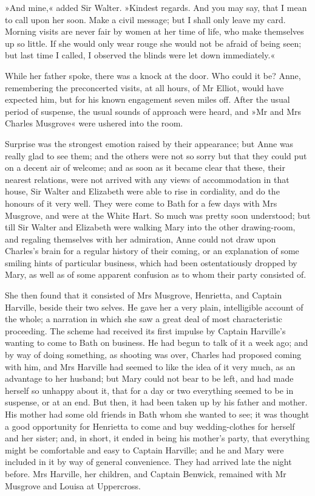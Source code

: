 »And mine,« added Sir Walter. »Kindest regards. And you may say, that I mean to call upon her soon. Make a civil message; but I shall only leave my card. Morning visits are never fair by women at her time of life, who make themselves up so little. If she would only wear rouge she would not be afraid of being seen; but last time I called, I observed the blinds were let down immediately.«

While her father spoke, there was a knock at the door. Who could it be? Anne, remembering the preconcerted visits, at all hours, of Mr Elliot, would have expected him, but for his known engagement seven miles off. After the usual period of suspense, the usual sounds of approach were heard, and »Mr and Mrs Charles Musgrove« were ushered into the room.

Surprise was the strongest emotion raised by their appearance; but Anne was really glad to see them; and the others were not so sorry but that they could put on a decent air of welcome; and as soon as it became clear that these, their nearest relations, were not arrived with any views of accommodation in that house, Sir Walter and Elizabeth were able to rise in cordiality, and do the honours of it very well. They were come to Bath for a few days with Mrs Musgrove, and were at the White Hart. So much was pretty soon understood; but till Sir Walter and Elizabeth were walking Mary into the other drawing-room, and regaling themselves with her admiration, Anne could not draw upon Charles's brain for a regular history of their coming, or an explanation of some smiling hints of particular business, which had been ostentatiously dropped by Mary, as well as of some apparent confusion as to whom their party consisted of.

She then found that it consisted of Mrs Musgrove, Henrietta, and Captain Harville, beside their two selves. He gave her a very plain, intelligible account of the whole; a narration in which she saw a great deal of most characteristic proceeding. The scheme had received its first impulse by Captain Harville's wanting to come to Bath on business. He had begun to talk of it a week ago; and by way of doing something, as shooting was over, Charles had proposed coming with him, and Mrs Harville had seemed to like the idea of it very much, as an advantage to her husband; but Mary could not bear to be left, and had made herself so unhappy about it, that for a day or two everything seemed to be in suspense, or at an end. But then, it had been taken up by his father and mother. His mother had some old friends in Bath whom she wanted to see; it was thought a good opportunity for Henrietta to come and buy wedding-clothes for herself and her sister; and, in short, it ended in being his mother's party, that everything might be comfortable and easy to Captain Harville; and he and Mary were included in it by way of general convenience. They had arrived late the night before. Mrs Harville, her children, and Captain Benwick, remained with Mr Musgrove and Louisa at Uppercross.

